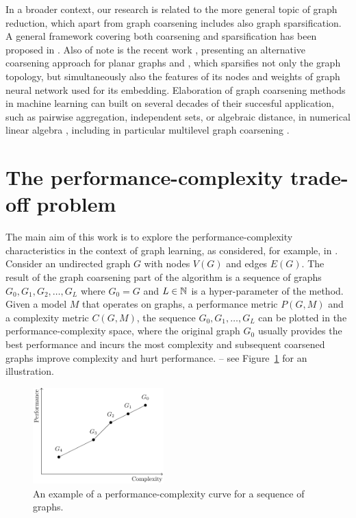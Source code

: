 \documentclass[sn-mathphys,pdflatex,iicol]{sn-jnl}%
\newcommand{\mathfield}{\ensuremath{\mathbb}}
\begin{document}
In a broader context, our research is related to the more general topic of graph reduction, which apart from graph coarsening includes also graph sparsification. A general framework covering both coarsening and sparsification has been proposed in \cite{bravo_hermsdorff_unifying_2019}. Also of note is the recent work \cite{kammer_space-efficient_2022}, presenting an alternative coarsening approach for planar graphs and \cite{liu_comprehensive_2022}, which sparsifies not only the graph topology, but simultaneously also the features of its nodes and weights of graph neural network used for its embedding. Elaboration of graph coarsening methods in machine learning can built on several decades of their succesful application, such as pairwise aggregation, independent sets, or algebraic distance, in numerical linear algebra \cite{chen_graph_2022}, including in particular multilevel graph coarsening \cite{osei-kuffuor_matrix_2015, ubaru_sampling_2019}.

\section{The performance-complexity trade-off problem}\label{sec:performance-complexity}

The main aim of this work is to explore the performance-complexity characteristics in the context of graph learning, as considered, for example, in \cite{prochazka_downstream_2022}. Consider an undirected graph \( G \) with nodes \( V \left( G \right) \) and edges \( E \left( G \right) \). The result of the graph coarsening part of the algorithm is a sequence of graphs \( G_0, G_1, G_2, \dots, G_L \) where \( G_0 = G \) and \( L \in \mathfield{N} \) is a hyper-parameter of the method.
Given a model \( M \) that operates on graphs, a performance metric \( P \left( G, M \right) \) and a complexity metric \( C \left( G, M \right) \), the sequence \( G_0, G_1, \dots, G_L \) can be plotted in the performance-complexity space, where the original graph \( G_0 \) usually provides the best performance and incurs the most complexity and subsequent coarsened graphs improve complexity and hurt performance. -- see Figure~\ref{fig:performance-complexity} for an illustration.

\begin{figure}
  \centering
  \includegraphics[width=0.45\textwidth]{images/performance-complexity/performance-complexity.pdf}
  \caption{An example of a performance-complexity curve for a sequence of graphs.}
  \label{fig:performance-complexity}
\end{figure}
\end{document}
